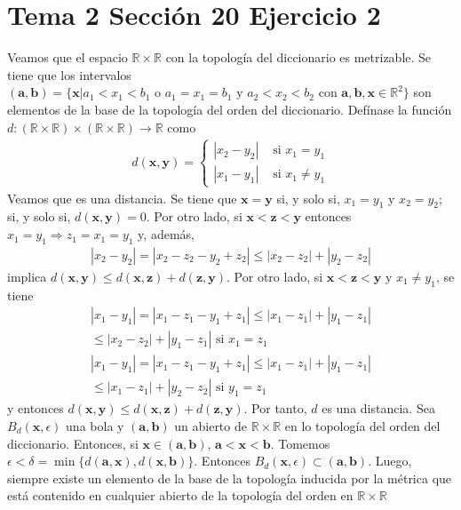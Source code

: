 \documentclass{article}
\newcommand{\vect}[1]{\boldsymbol{#1}}
\begin{document}
\section{Tema 2 Sección 20 Ejercicio 2}
Veamos que el espacio $\mathbb{R}\times \mathbb{R}$ con la topología del diccionario es metrizable. Se tiene que los intervalos $(\vect{a},\vect{b})=\{\vect{x}| a_1<x_1<b_1 \text{ o }a_1=x_1=b_1 \text{ y }a_2<x_2<b_2 \text{ con }\vect{a},\vect{b},\vect{x}\in \mathbb{R}^2\}$ son elementos de la base de la topología del orden del diccionario. Defínase la función $d:(\mathbb{R}\times \mathbb{R})\times (\mathbb{R}\times \mathbb{R})\rightarrow \mathbb{R}$ como
\begin{eqnarray}
d(\vect{x},\vect{y})=
\begin{cases}
|x_2-y_2|& \text{ si }x_1=y_1\nonumber\\
|x_1-y_1|& \text{ si }x_1\neq y_1\nonumber
\end{cases}
\end{eqnarray}
Veamos que es una distancia. Se tiene que $\vect{x}=\vect{y}$ si, y solo si, $x_1=y_1$ y $x_2=y_2$; si, y solo si, $d(\vect{x},\vect{y})=0$. Por otro lado, si $\vect{x}<\vect{z}<\vect{y}$ entonces $x_1=y_1\Rightarrow z_1=x_1=y_1$ y, además,
\begin{eqnarray}
|x_2-y_2| = |x_2-z_2-y_2+z_2|
\leq |x_2-z_2|+|y_2-z_2|\nonumber
\end{eqnarray}
implica $d(\vect{x},\vect{y})\leq d(\vect{x},\vect{z})+d(\vect{z},\vect{y})$. Por otro lado, si $\vect{x}<\vect{z}<\vect{y}$ y $x_1\neq y_1$, se tiene
\begin{eqnarray}
|x_1-y_1| = |x_1-z_1-y_1+z_1|
\leq |x_1-z_1|+|y_1-z_1|\nonumber\\
\leq |x_2-z_2|+|y_1-z_1|\text{ si }x_1=z_1\nonumber\\
|x_1-y_1| = |x_1-z_1-y_1+z_1|
\leq |x_1-z_1|+|y_1-z_1|\nonumber\\
\leq |x_1-z_1|+|y_2-z_2|\text{ si }y_1=z_1\nonumber
\end{eqnarray}
 y entonces $d(\vect{x},\vect{y})\leq d(\vect{x},\vect{z})+d(\vect{z},\vect{y})$. Por tanto, $d$ es una distancia. Sea $B_d(\vect{x},\epsilon)$ una bola y $(\vect{a},\vect{b})$ un abierto de $\mathbb{R}\times \mathbb{R}$ en lo topología del orden del diccionario. Entonces, si $\vect{x}\in (\vect{a},\vect{b})$,  $\vect{a}<\vect{x}<\vect{b}$. Tomemos $\epsilon< \delta =\min\{d(\vect{a},\vect{x}),d(\vect{x},\vect{b})\}$. Entonces $B_d(\vect{x},\epsilon) \subset (\vect{a},\vect{b})$. Luego, siempre existe un elemento de la base de la topología inducida por la métrica que está contenido en cualquier abierto de la topología del orden en $\mathbb{R}\times \mathbb{R}$ 
\end{document}
